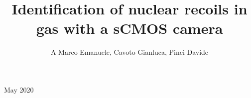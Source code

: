 \documentclass[12pt]{iopart}
\begin{document}
\title[]{Identification of  nuclear recoils in gas  with a sCMOS camera}

\newcommand {\ie}{\mbox{i.e.}\xspace}     %
\newcommand {\eg}{\mbox{e.g.}\xspace}     %

\newcommand{\fe}{\ensuremath{^{55}\textrm{Fe}}\xspace}
\newcommand{\abs}[1]{\ensuremath{\vert #1 \vert}}
\newcommand{\ambe}{\ensuremath{\textrm{Am} \textrm{Be}}\xspace}
\newcommand{\isclu}{\ensuremath{I_{SC}}\xspace}
\newcommand{\tsigmag}{\ensuremath{\sigma^T_{Gauss}}\xspace}
\newcommand{\dedl}{\ensuremath{\frac{dE}{dl_p}}\xspace}

\newcommand{\lemon}{{\textsc{Lemon}}\xspace}
\newcommand{\idbscan}{{\textsc{Idbscan}}\xspace}
\newcommand{\dbscan}{{\textsc{Dbscan}}\xspace}
\newcommand{\gac}{{\textsc{Gac}}\xspace}
\newcommand{\nnc}{{\textsc{Nnc}}\xspace}
\newcommand{\GEANTfour} {{\textsc{Geant4}}\xspace}
\newcommand{\SRIM} {{\textsc{Srim}}\xspace}
\newcommand{\garfield} {{\textsc{Garfield}}\xspace}
\newcommand{\PYTHONthree} {{\textsc{Python3}}\xspace}
\newcommand{\ROOT} {{\textsc{Root6}}\xspace}

\newcommand{\unit}[1]{\ensuremath{\textrm{\,#1}}\xspace}
\newcommand{\keV}{\ensuremath{\,\textrm{ke\hspace{-.08em}V}}\xspace}
\newcommand{\MeV}{\ensuremath{\,\textrm{Me\hspace{-.08em}V}}\xspace}

\author{A Marco Emanuele, Cavoto Gianluca, Pinci Davide}

\address{San Miguel, Mexico}
\vspace{10pt}
\begin{indented}
\item[]May 2020
\end{indented}

\begin{abstract}

\end{abstract}

%
%
%
% 
%
\end{document}
